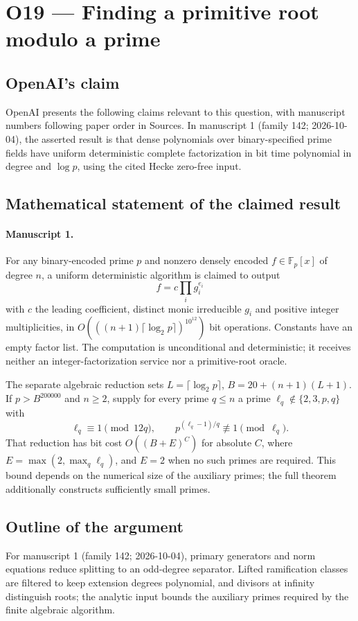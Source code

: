 \documentclass[11pt]{article}
\begin{document}
\section*{O19 — Finding a primitive root modulo a prime}

\subsection{OpenAI's claim}
OpenAI presents the following claims relevant to this question, with manuscript numbers following paper order in Sources. In manuscript 1 (family 142; 2026-10-04), the asserted result is that dense polynomials over binary-specified prime fields have uniform deterministic complete factorization in bit time polynomial in degree and $\log p$, using the cited Hecke zero-free input.

\subsection{Mathematical statement of the claimed result}
\paragraph{Manuscript 1.}
For any binary-encoded prime $p$ and nonzero densely encoded $f\in\mathbb F_p[x]$ of degree $n$, a uniform deterministic algorithm is claimed to output
\[
 f=c\prod_i g_i^{e_i}
\]
with $c$ the leading coefficient, distinct monic irreducible $g_i$ and positive integer multiplicities, in $O(((n+1)\lceil\log_2p\rceil)^{10^{12}})$ bit operations. Constants have an empty factor list. The computation is unconditional and deterministic; it receives neither an integer-factorization service nor a primitive-root oracle.

The separate algebraic reduction sets $L=\lceil\log_2p\rceil$, $B=20+(n+1)(L+1)$. If $p>B^{200000}$ and $n\ge2$, supply for every prime $q\le n$ a prime $\ell_q\notin\{2,3,p,q\}$ with
\[
 \ell_q\equiv1\pmod{12q},\qquad p^{(\ell_q-1)/q}\not\equiv1\pmod{\ell_q}.
\]
That reduction has bit cost $O((B+E)^C)$ for absolute $C$, where $E=\max(2,\max_q\ell_q)$, and $E=2$ when no such primes are required. This bound depends on the numerical size of the auxiliary primes; the full theorem additionally constructs sufficiently small primes.

\subsection{Outline of the argument}
For manuscript 1 (family 142; 2026-10-04), primary generators and norm equations reduce splitting to an odd-degree separator. Lifted ramification classes are filtered to keep extension degrees polynomial, and divisors at infinity distinguish roots; the analytic input bounds the auxiliary primes required by the finite algebraic algorithm.
\end{document}
